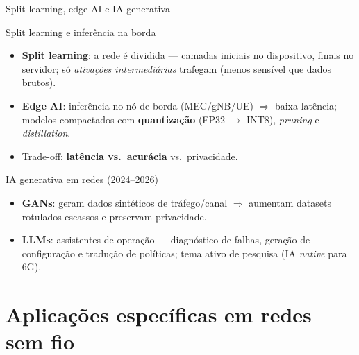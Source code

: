 \documentclass[aspectratio=169,11pt]{beamer}
\begin{document}
\begin{frame}{Split learning, edge AI e IA generativa}
  \begin{block}{Split learning e inferência na borda}
    \begin{itemize}
      \item \textbf{Split learning}: a rede é dividida --- camadas iniciais no dispositivo, finais no servidor; só \emph{ativações intermediárias} trafegam (menos sensível que dados brutos).
      \item \textbf{Edge AI}: inferência no nó de borda (MEC/gNB/UE) $\Rightarrow$ baixa latência; modelos compactados com \textbf{quantização} (FP32 $\to$ INT8), \emph{pruning} e \emph{distillation}.
      \item Trade-off: \textbf{latência vs.\ acurácia} vs.\ privacidade.
    \end{itemize}
  \end{block}
  \begin{block}{IA generativa em redes (2024--2026)}
    \begin{itemize}
      \item \textbf{GANs}: geram dados sintéticos de tráfego/canal $\Rightarrow$ aumentam datasets rotulados escassos e preservam privacidade.
      \item \textbf{LLMs}: assistentes de operação --- diagnóstico de falhas, geração de configuração e tradução de políticas; tema ativo de pesquisa (IA \emph{native} para 6G).
    \end{itemize}
  \end{block}
\end{frame}

\section{Aplicações específicas em redes sem fio}
\end{document}
